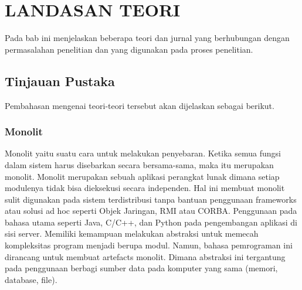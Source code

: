 \chapter{LANDASAN TEORI}
\vspace{4.5pt}
Pada bab ini menjelaskan beberapa teori dan jurnal yang berhubungan dengan permasalahan penelitian dan yang digunakan pada proses penelitian.
\section{Tinjauan Pustaka}
Pembahasan mengenai teori-teori tersebut akan dijelaskan sebagai berikut.
\subsection{Monolit}
Monolit yaitu suatu cara untuk melakukan penyebaran. Ketika semua fungsi dalam sistem harus disebarkan secara bersama-sama, maka itu merupakan monolit.\cite{6} Monolit merupakan sebuah aplikasi perangkat lunak dimana setiap modulenya tidak bisa dieksekusi secara independen. Hal ini membuat monolit sulit digunakan pada sistem terdistribusi tanpa bantuan penggunaan frameworks atau solusi ad hoc seperti Objek Jaringan, RMI atau CORBA.
Penggunaan pada bahasa utama seperti Java, C/C++, dan Python pada pengembangan aplikasi di sisi server. Memiliki kemampuan melakukan abstraksi untuk memecah kompleksitas program menjadi berupa modul. Namun, bahasa pemrograman ini dirancang untuk membuat artefacts monolit. Dimana abstraksi ini tergantung pada penggunaan berbagi sumber data pada komputer yang sama (memori, database, file). 


